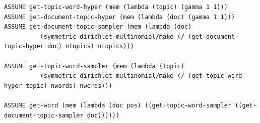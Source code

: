 \documentclass[10pt]{article}
\begin{document}
\begin{leftbar} \begin{small} \begin{verbatim}
ASSUME get-topic-word-hyper (mem (lambda (topic) (gamma 1 1)))
ASSUME get-document-topic-hyper (mem (lambda (doc) (gamma 1 1)))
ASSUME get-document-topic-sampler (mem (lambda (doc) 
          (symmetric-dirichlet-multinomial/make (/ (get-document-topic-hyper doc) ntopics) ntopics)))

ASSUME get-topic-word-sampler (mem (lambda (topic) 
          (symmetric-dirichlet-multinomial/make (/ (get-topic-word-hyper topic) nwords) nwords)))

ASSUME get-word (mem (lambda (doc pos) ((get-topic-word-sampler ((get-document-topic-sampler doc))))))
\end{verbatim} \end{small} \end{leftbar}
\end{document}
